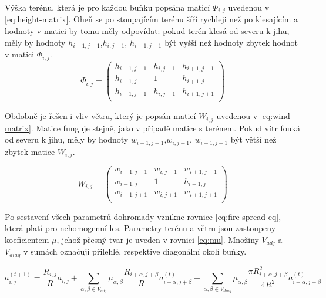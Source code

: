 \documentclass[11pt,a4paper]{scrartcl}
\begin{document}
	Výška terénu, která je pro každou buňku popsána maticí $\Phi_{i,j}$ uvedenou v \ref{eq:height-matrix}. Oheň se po stoupajícím terénu šíří rychleji než po klesajícím \cite{source_article} a hodnoty v matici by tomu měly odpovídat: pokud terén klesá od severu k jihu, měly by hodnoty $h_{i-1,j-1}$,$h_{i,j-1}$, $h_{i+1,j-1}$ být vyšší než hodnoty zbytek hodnot v matici $\Phi_{i,j}$.
\begin{equation}
	\Phi_{i,j} =
	\begin{pmatrix}
	h_{i-1,j-1}       & h_{i,j-1} & h_{i+1,j-1} \\
	h_{i-1,j}       & 1 & h_{i+1,j} \\
	h_{i-1,j+1}       & h_{i,j+1} & h_{i+1,j+1} \\
	\end{pmatrix}
	\label{eq:height-matrix}
\end{equation}	
	
	Obdobně je řešen i vliv větru, který je popsán maticí $W_{i,j}$ uvedenou v \ref{eq:wind-matrix}. Matice funguje stejně, jako v případě matice s terénem. Pokud vítr fouká od severu k jihu, měly by hodnoty $w_{i-1,j-1}$,$w_{i,j-1}$, $w_{i+1,j-1}$ být větší než zbytek matice $W_{i,j}$.
	
	\begin{equation}
	W_{i,j} =
	\begin{pmatrix}
	w_{i-1,j-1}       & w_{i,j-1} & w_{i+1,j-1} \\
	w_{i-1,j}       & 1 & h_{i+1,j} \\
	w_{i-1,j+1}       & w_{i,j+1} & w_{i+1,j+1} \\
	\end{pmatrix}
	\label{eq:wind-matrix}
	\end{equation}	
	
	Po sestavení všech parametrů dohromady vznikne rovnice \ref{eq:fire-spread-eq}, která platí pro nehomogenní les. Parametry terénu a větru jsou zastoupeny koeficientem $\mu$, jehož přesný tvar je uveden v rovnici \ref{eq:mu}. Množiny $V_{adj}$ a $V_{diag}$ v sumách označují přilehlé, respektive diagonální okolí buňky.
	
	\begin{equation}
	a_{i,j}^{(t+1)} = \frac{R_{i,j}}{R}a_{i,j} + 
	\sum_{\alpha,\beta \in V_{adj}} \mu_{\alpha,\beta} \frac{R_{i + \alpha, j+\beta}}{R} a_{i + \alpha, j + \beta} ^{(t)} + 
	\sum_{\alpha,\beta \in V_{diag}} \mu_{\alpha,\beta} \frac{\pi R_{i + \alpha, j+\beta} ^2}{4R^2} a_{i + \alpha, j + \beta} ^{(t)}	
	\label{eq:fire-spread-eq}
	\end{equation}
	
\end{document}
